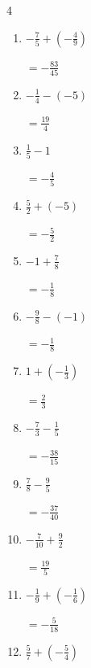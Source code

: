 \begin{multicols}{4}
\begin{enumerate}
        $\displaystyle =-\frac{1}{63}$

  \item $\displaystyle -\frac{7}{5} + \left(-\frac{4}{9}\right)$

        $\displaystyle =-\frac{83}{45}$

  \item $\displaystyle -\frac{1}{4} - \left(-5\right)$

        $\displaystyle =\frac{19}{4}$

  \item $\displaystyle \frac{1}{5} - 1$

        $\displaystyle =-\frac{4}{5}$

  \item $\displaystyle \frac{5}{2} + \left(-5\right)$

        $\displaystyle =-\frac{5}{2}$

  \item $\displaystyle -1 + \frac{7}{8}$

        $\displaystyle =-\frac{1}{8}$

  \item $\displaystyle -\frac{9}{8} - \left(-1\right)$

        $\displaystyle =-\frac{1}{8}$

  \item $\displaystyle 1 + \left(-\frac{1}{3}\right)$

        $\displaystyle =\frac{2}{3}$

  \item $\displaystyle -\frac{7}{3} - \frac{1}{5}$

        $\displaystyle =-\frac{38}{15}$

\columnbreak %

  \item $\displaystyle \frac{7}{8} - \frac{9}{5}$

        $\displaystyle =-\frac{37}{40}$

  \item $\displaystyle -\frac{7}{10} + \frac{9}{2}$

        $\displaystyle =\frac{19}{5}$

  \item $\displaystyle -\frac{1}{9} + \left(-\frac{1}{6}\right)$

        $\displaystyle =-\frac{5}{18}$

  \item $\displaystyle \frac{5}{7} + \left(-\frac{5}{4}\right)$


\end{enumerate}
\end{multicols}
